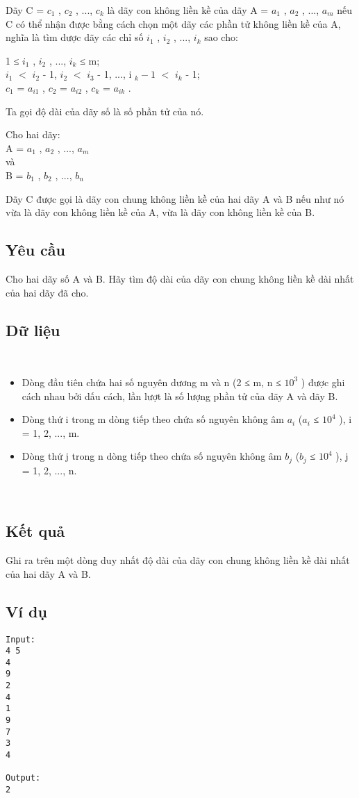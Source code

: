 

Dãy C = $c_{1}$ , $c_{2}$ , ..., $c_{k}$ là dãy con không liền kề của dãy A = $a_{1}$ , $a_{2}$ , ..., $a_{m}$ nếu C có thể nhận được bằng cách chọn một dãy các phần tử không liền kề của A, nghĩa là tìm dược dãy các chỉ số $i_{1}$ , $i_{2}$ , ..., $i_{k}$ sao cho:

1 ≤ $i_{1}$ , $i_{2}$ , ..., $i_{k}$ ≤ m;
\\$i_{1}$ $<$ $i_{2}$ - 1, $i_{2}$ $<$ $i_{3}$ - 1, ..., i $_ k - 1 $ $<$ $i_{k}$ - 1;
\\$c_{1}$ = $a_{i1}$ , $c_{2}$ = $a_{i2}$ , $c_{k}$ = $a_{ik}$ .

Ta gọi độ dài của dãy số là số phần tử của nó.

Cho hai dãy:
\\A = $a_{1}$ , $a_{2}$ , ..., $a_{m}$
\\và
\\B = $b_{1}$ , $b_{2}$ , ..., $b_{n}$

Dãy C được gọi là dãy con chung không liền kề của hai dãy A và B nếu như nó vừa là dãy con không liền kề của A, vừa là dãy con không liền kề của B.

\subsection{Yêu cầu}

Cho hai dãy số A và B. Hãy tìm độ dài của dãy con chung không liền kề dài nhất của hai dãy đã cho.

\subsection{Dữ liệu}

 
\begin{itemize}
	\item Dòng đầu tiên chứa hai số nguyên dương m và n (2 ≤ m, n ≤ $10^{3}$ ) được ghi cách nhau bởi dấu cách, lần lượt là số lượng phần tử của dãy A và dãy B.
	\item Dòng thứ i trong m dòng tiếp theo chứa số nguyên không âm $a_{i}$ ($a_{i}$ ≤ $10^{4}$ ), i = 1, 2, ..., m.
	\item Dòng thứ j trong n dòng tiếp theo chứa số nguyên không âm $b_{j}$ ($b_{j}$ ≤ $10^{4}$ ), j = 1, 2, ..., n.
\end{itemize}

 

\subsection{Kết quả}

Ghi ra trên một dòng duy nhất độ dài của dãy con chung không liền kề dài nhất của hai dãy A và B.

\subsection{Ví dụ}
\begin{verbatim}
Input:
4 5
4
9
2
4
1
9
7
3
4

Output:
2
\end{verbatim}
